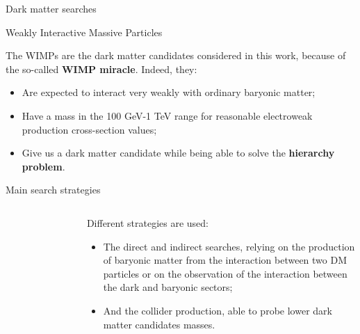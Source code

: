\documentclass[8pt]{beamer}
\begin{document}
\begin{frame}{Dark matter searches}
\justifying

\vspace{5pt}
\begin{block}{ \centering Weakly Interactive Massive Particles}\end{block} \vfill
The WIMPs are the dark matter candidates considered in this work, because of the so-called \textbf{WIMP miracle}. Indeed, they:

\begin{itemize}
\justifying
\item Are expected to interact very weakly with ordinary baryonic matter;
\item Have a mass in the 100 GeV-1 TeV range for reasonable electroweak production cross-section values;
\item Give us a dark matter candidate while being able to solve the \textbf{hierarchy problem}.
\end{itemize} \vfill

\vspace{5pt}
\begin{block}{ \centering Main search strategies}\end{block} \vfill

\begin{columns}
	\begin{column}{0.45\textwidth}
\begin{figure}[htbp]
\begin{center}
\begin{figure}[htbp]
\begin{center}
\includegraphics[width=4.2cm, height=3.5cm]{figs/ThreeWays.png}
\end{center}
\end{figure}
\end{center}
\end{figure}
\end{column}
\begin{column}{0.54\textwidth}
Different strategies are used:

\begin{itemize}
\justifying
\item The \alert{direct and indirect searches}, relying on the production of baryonic
matter from the interaction between two DM particles or on the observation of the interaction
between the dark and baryonic sectors;
\item And the \alert{collider production}, able to probe lower dark matter candidates masses.
\end{itemize}

\end{column}
\end{columns} \vfill
\end{frame}
\end{document}

